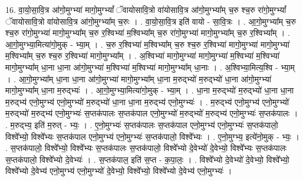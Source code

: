\documentclass[17pt]{extarticle}
\begin{document}
16. वा॒यो॒सा॒वि॒त्र आ॑गो॒मुग्भ्या॑ मागो॒मुग्भ्यां᳚ ॅवायोसावि॒त्रो वा॑योसावि॒त्र आ॑गो॒मुग्भ्या᳚म् च॒रु श्च॒रु रा॑गो॒मुग्भ्यां᳚ ॅवायोसावि॒त्रो वा॑योसावि॒त्र आ॑गो॒मुग्भ्या᳚म् च॒रुः । . वा॒यो॒सा॒वि॒त्र इति॑ वायो - सा॒वि॒त्रः । . आ॒गो॒मुग्भ्या᳚म् च॒रु श्च॒रु रा॑गो॒मुग्भ्या॑ मागो॒मुग्भ्या᳚म् च॒रु र॒श्विभ्या॑ म॒श्विभ्या᳚म् च॒रु रा॑गो॒मुग्भ्या॑ मागो॒मुग्भ्या᳚म् च॒रु र॒श्विभ्या᳚म् । . आ॒गो॒मुग्भ्या॒मित्या॑गो॒मुक् - भ्या॒म् । . च॒रु र॒श्विभ्या॑ म॒श्विभ्या᳚म् च॒रु श्च॒रु र॒श्विभ्या॑ मागो॒मुग्भ्या॑ मागो॒मुग्भ्या॑ म॒श्विभ्या᳚म् च॒रु श्च॒रु र॒श्विभ्या॑ मागो॒मुग्भ्या᳚म् । . अ॒श्विभ्या॑ मागो॒मुग्भ्या॑ मागो॒मुग्भ्या॑ म॒श्विभ्या॑ म॒श्विभ्या॑ मागो॒मुग्भ्या᳚म् धा॒ना धा॒ना आ॑गो॒मुग्भ्या॑ म॒श्विभ्या॑ म॒श्विभ्या॑ मागो॒मुग्भ्या᳚म् धा॒नाः । . अ॒श्विभ्या॒मित्य॒श्वि - भ्या॒म् । . आ॒गो॒मुग्भ्या᳚म् धा॒ना धा॒ना आ॑गो॒मुग्भ्या॑ मागो॒मुग्भ्या᳚म् धा॒ना म॒रुद्भ्यो॑ म॒रुद्भ्यो॑ धा॒ना आ॑गो॒मुग्भ्या॑ मागो॒मुग्भ्या᳚म् धा॒ना म॒रुद्भ्यः॑ । . आ॒गो॒मुग्भ्या॒मित्या॑गो॒मुक् - भ्या॒म् । . धा॒ना म॒रुद्भ्यो॑ म॒रुद्भ्यो॑ धा॒ना धा॒ना म॒रुद्भ्य॑ एनो॒मुग्भ्य॑ एनो॒मुग्भ्यो॑ म॒रुद्भ्यो॑ धा॒ना धा॒ना म॒रुद्भ्य॑ एनो॒मुग्भ्यः॑ । . म॒रुद्भ्य॑ एनो॒मुग्भ्य॑ एनो॒मुग्भ्यो॑ म॒रुद्भ्यो॑ म॒रुद्भ्य॑ एनो॒मुग्भ्यः॑ स॒प्तक॑पालः स॒प्तक॑पाल एनो॒मुग्भ्यो॑ म॒रुद्भ्यो॑ म॒रुद्भ्य॑ एनो॒मुग्भ्यः॑ स॒प्तक॑पालः । . म॒रुद्भ्य॒ इति॑ म॒रुत् - भ्यः॒ । . ए॒नो॒मुग्भ्यः॑ स॒प्तक॑पालः स॒प्तक॑पाल एनो॒मुग्भ्य॑ एनो॒मुग्भ्यः॑ स॒प्तक॑पालो॒ विश्वे᳚भ्यो॒ विश्वे᳚भ्यः स॒प्तक॑पाल एनो॒मुग्भ्य॑ एनो॒मुग्भ्यः॑ स॒प्तक॑पालो॒ विश्वे᳚भ्यः । . ए॒नो॒मुग्भ्य॒ इत्ये॑नो॒मुक् - भ्यः॒ । . स॒प्तक॑पालो॒ विश्वे᳚भ्यो॒ विश्वे᳚भ्यः स॒प्तक॑पालः स॒प्तक॑पालो॒ विश्वे᳚भ्यो दे॒वेभ्यो॑ दे॒वेभ्यो॒ विश्वे᳚भ्यः स॒प्तक॑पालः स॒प्तक॑पालो॒ विश्वे᳚भ्यो दे॒वेभ्यः॑ । . स॒प्तक॑पाल॒ इति॑ स॒प्त - क॒पा॒लः॒ । . विश्वे᳚भ्यो दे॒वेभ्यो॑ दे॒वेभ्यो॒ विश्वे᳚भ्यो॒ विश्वे᳚भ्यो दे॒वेभ्य॑ एनो॒मुग्भ्य॑ एनो॒मुग्भ्यो॑ दे॒वेभ्यो॒ विश्वे᳚भ्यो॒ विश्वे᳚भ्यो दे॒वेभ्य॑ एनो॒मुग्भ्यः॑ । \newline
\end{document}
